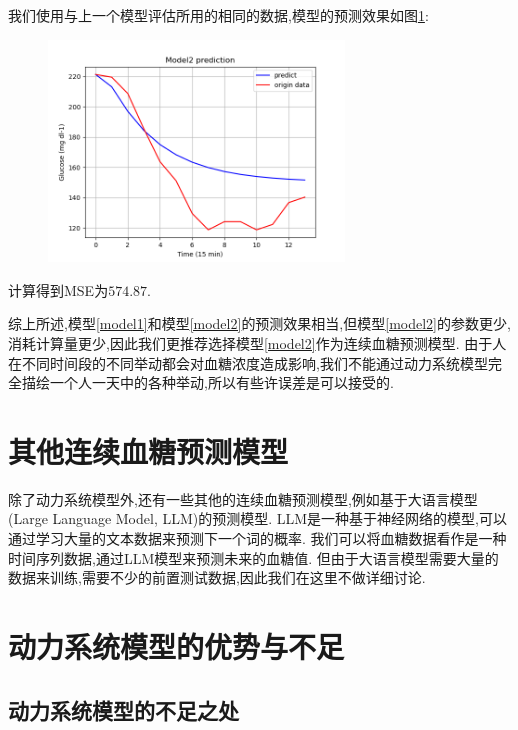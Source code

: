     我们使用与上一个模型评估所用的相同的数据,模型的预测效果如图\ref{fig:predict}:
    \begin{figure}[H]
        \centering
        \includegraphics[width=0.7\textwidth]{Img/predict.png}
        \label{fig:predict}
    \end{figure}

    计算得到MSE为$574.87$. 

    综上所述,模型\ref{model1}和模型\ref{model2}的预测效果相当,但模型\ref{model2}的参数更少,消耗计算量更少,因此我们更推荐选择模型\ref{model2}作为连续血糖预测模型. 由于人在不同时间段的不同举动都会对血糖浓度造成影响,我们不能通过动力系统模型完全描绘一个人一天中的各种举动,所以有些许误差是可以接受的. 

    \section{其他连续血糖预测模型}

    除了动力系统模型外,还有一些其他的连续血糖预测模型,例如基于大语言模型(Large Language Model, LLM)的预测模型\cite{healey2024leveraging}. LLM是一种基于神经网络的模型,可以通过学习大量的文本数据来预测下一个词的概率. 我们可以将血糖数据看作是一种时间序列数据,通过LLM模型来预测未来的血糖值. 但由于大语言模型需要大量的数据来训练,需要不少的前置测试数据,因此我们在这里不做详细讨论. 

    \section{动力系统模型的优势与不足}

    \subsection*{动力系统模型的不足之处}
    
